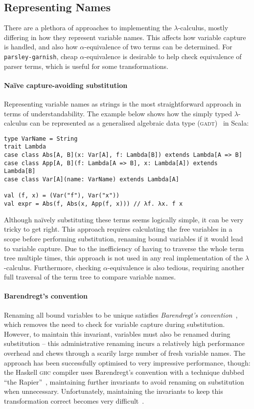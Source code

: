 \documentclass[../../../main.tex]{subfiles}
\begin{document}
\subsection{Representing Names}
There are a plethora of approaches to implementing the $\lambda$-calculus, mostly differing in how they represent variable names.
This affects how variable capture is handled, and also how $\alpha$-equivalence of two terms can be determined.
For \texttt{parsley-garnish}, cheap $\alpha$-equivalence is desirable to help check equivalence of parser terms, which is useful for some transformations.

\paragraph{Naïve capture-avoiding substitution}
Representing variable names as strings is the most straightforward approach in terms of understandability.
The example below shows how the simply typed $\lambda$-calculus can be represented as a generalised algebraic data type (\textsc{gadt})~\cite{cheney_gadt_2003} in Scala:

\begin{verbatim}
type VarName = String
trait Lambda
case class Abs[A, B](x: Var[A], f: Lambda[B]) extends Lambda[A => B]
case class App[A, B](f: Lambda[A => B], x: Lambda[A]) extends Lambda[B]
case class Var[A](name: VarName) extends Lambda[A]

val (f, x) = (Var("f"), Var("x"))
val expr = Abs(f, Abs(x, App(f, x))) // λf. λx. f x
\end{verbatim}
%
Although naïvely substituting these terms seems logically simple, it can be very tricky to get right.
This approach requires calculating the free variables in a scope before performing substitution, renaming bound variables if it would lead to variable capture.
Due to the inefficiency of having to traverse the whole term tree multiple times, this approach is not used in any real implementation of the $\lambda$-calculus.
Furthermore, checking $\alpha$-equivalence is also tedious, requiring another full traversal of the term tree to compare variable names.

\paragraph{Barendregt's convention}
Renaming all bound variables to be unique satisfies \emph{Barendregt's convention}~\cite{barendregt_lambda_1984}, which removes the need to check for variable capture during substitution.
However, to maintain this invariant, variables must also be renamed during substitution -- this administrative renaming incurs a relatively high performance overhead and chews through a scarily large number of fresh variable names.
The approach has been successfully optimised to very impressive performance, though:
the Haskell \textsc{ghc} compiler uses Barendregt's convention with a technique dubbed ``the Rapier''~\cite{peytonjones_secrets_2002}, maintaining further invariants to avoid renaming on substitution when unnecessary.
Unfortunately, maintaining the invariants to keep this transformation correct becomes very difficult~\cite{maclaurin_thefoil_2023}.
\end{document}
